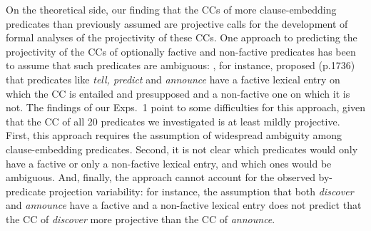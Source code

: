 \documentclass[11pt,fleqn]{article}
\newcommand{\6}{\mbox{$[\hspace*{-.6mm}[$}}
\newcommand{\9}{\mbox{$]\hspace*{-.6mm}]$}}
\begin{document}
{On the theoretical side, our finding that the CCs of more clause-embedding predicates than previously assumed are projective calls for the development of formal analyses of the projectivity of these CCs. One approach to predicting the projectivity of the CCs of optionally factive and non-factive predicates has been to assume that such predicates are ambiguous: \citet{spector-egre2015}, for instance, proposed (p.1736) that predicates like {\em tell, predict} and {\em announce}  have a factive lexical entry on which the CC is entailed and presupposed and a non-factive one on which it is not. The findings of our Exps.~1 point to some difficulties for this approach, given that the CC of all 20 predicates we investigated is at least mildly projective. First, this approach requires the assumption of widespread ambiguity among clause-embedding predicates. Second, it is not clear which predicates would only have a factive or only a non-factive lexical entry, and which ones would be ambiguous. And, finally, the approach cannot account for the observed by-predicate projection variability: for instance, the assumption that both {\em discover} and {\em announce} have a factive and a non-factive lexical entry does not predict that the CC of {\em discover} more projective than the CC of {\em announce}.

}
\end{document}
